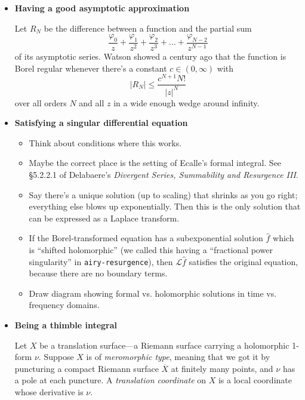 \documentclass{article}
\newcommand{\laplace}{\mathcal{L}}
\begin{document}
\begin{itemize}
\item \textbf{Having a good asymptotic approximation}

Let $R_N$ be the difference between a function and the partial sum
\[ \frac{\varphi_0}{z} + \frac{\varphi_1}{z^2} + \frac{\varphi_2}{z^3} + \ldots + \frac{\varphi_{N-2}}{z^{N-1}} \]
of its asymptotic series. Watson showed a century ago that the function is Borel regular whenever there's a constant $c \in (0, \infty)$ with
\[ |R_N| \le \frac{c^{N+1} N!}{|z|^N} \]
over all orders $N$ and all $z$ in a wide enough wedge around infinity.
\item \textbf{Satisfying a singular differential equation}

\begin{itemize}
\item Think about conditions where this works.
\item Maybe the correct place is the setting of Ecalle's formal integral. See \S 5.2.2.1 of Delabaere's {\em Divergent Series, Summability and Resurgence III}.
\item Say there's a unique solution (up to scaling) that shrinks as you go right; everything else blows up exponentially. Then this is the only solution that can be expressed as a Laplace transform.
\item If the Borel-transformed equation has a subexponential solution $\hat{f}$ which is ``shifted holomorphic'' (we called this having a ``fractional power singularity'' in {\tt airy-resurgence}), then $\laplace \hat{f}$ satisfies the original equation, because there are no boundary terms.
\item Draw diagram showing formal vs. holomorphic solutions in time vs. frequency domains.
\end{itemize}
\item \textbf{Being a thimble integral}

Let $X$ be a translation surface---a Riemann surface carrying a holomorphic 1-form $\nu$. Suppose $X$ is of {\em meromorphic type}, meaning that we got it by puncturing a compact Riemann surface $\overline{X}$ at finitely many points, and $\nu$ has a pole at each puncture. A {\em translation coordinate} on $X$ is a local coordinate whose derivative is $\nu$.


\end{itemize}
\end{document}
